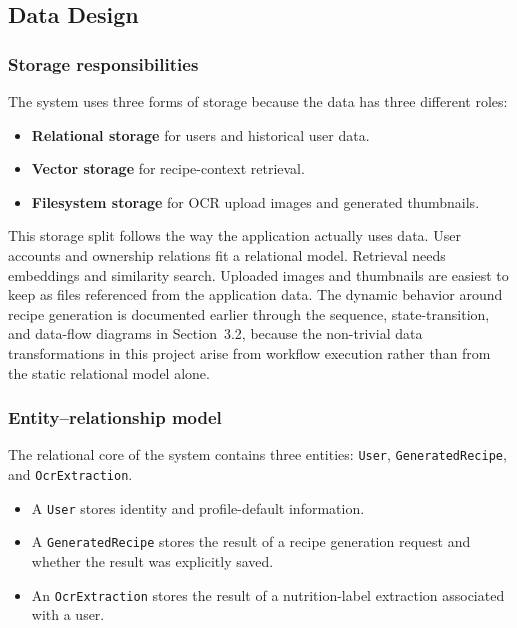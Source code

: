 \subsection{Data Design}

\subsubsection{Storage responsibilities}

The system uses three forms of storage because the data has three
different roles:

\begin{itemize}
	\item \textbf{Relational storage} for users and historical user data.
	\item \textbf{Vector storage} for recipe-context retrieval.
	\item \textbf{Filesystem storage} for OCR upload images and generated
	thumbnails.
\end{itemize}

This storage split follows the way the application actually uses data.
User accounts and ownership relations fit a relational model. Retrieval
needs embeddings and similarity search. Uploaded images and thumbnails
are easiest to keep as files referenced from the application data.
The dynamic behavior around recipe generation is documented earlier
through the sequence, state-transition, and data-flow diagrams in
Section~3.2, because the non-trivial data transformations in this
project arise from workflow execution rather than from the static
relational model alone.

\subsubsection{Entity--relationship model}

The relational core of the system contains three entities:
\texttt{User}, \texttt{GeneratedRecipe}, and \texttt{OcrExtraction}.

\begin{itemize}
	\item A \texttt{User} stores identity and profile-default information.
	\item A \texttt{GeneratedRecipe} stores the result of a recipe
	generation request and whether the result was explicitly saved.
	\item An \texttt{OcrExtraction} stores the result of a nutrition-label
	extraction associated with a user.
\end{itemize}


